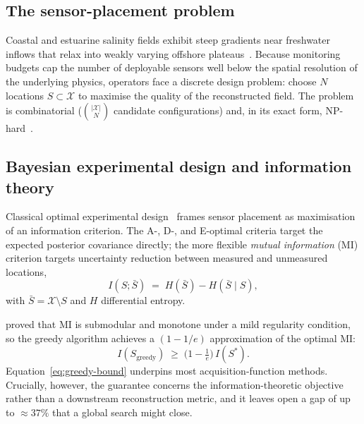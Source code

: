 \documentclass[11pt,letterpaper]{article}
\begin{document}
\subsection{The sensor-placement problem}
Coastal and estuarine salinity fields exhibit steep gradients near
freshwater inflows that relax into weakly varying offshore
plateaus~\citep{geyer2014estuarine}. Because monitoring budgets cap the
number of deployable sensors well below the spatial resolution of the
underlying physics, operators face a discrete design problem: choose
$N$ locations $S\subset\mathcal{X}$ to maximise the quality of the
reconstructed field. The problem is combinatorial
($\binom{|\mathcal{X}|}{N}$ candidate configurations) and, in its exact
form, NP-hard~\citep{ko1995exact}.

\subsection{Bayesian experimental design and information theory}
Classical optimal experimental
design~\citep{fedorov1972theory,chaloner1995bayesian} frames sensor
placement as maximisation of an information criterion. The A-, D-, and
E-optimal criteria target the expected posterior covariance directly;
the more flexible \emph{mutual information} (MI) criterion
\citep{caselton1984optimal,krause2008near} targets uncertainty
reduction between measured and unmeasured locations,
\begin{equation}
\label{eq:mi}
I(S;\bar S)\;=\;H(\bar S)-H(\bar S\mid S),
\end{equation}
with $\bar S=\mathcal{X}\setminus S$ and $H$ differential entropy.

\citet{krause2008near} proved that MI is submodular and monotone under
a mild regularity condition, so the greedy algorithm achieves a
$(1-1/e)$ approximation of the optimal MI:
\begin{equation}
\label{eq:greedy-bound}
I(S_{\text{greedy}})\;\ge\;\bigl(1-\tfrac{1}{e}\bigr)\,I(S^{*}).
\end{equation}
Equation~\eqref{eq:greedy-bound} underpins most acquisition-function
methods. Crucially, however, the guarantee concerns the
information-theoretic objective rather than a downstream reconstruction
metric, and it leaves open a gap of up to $\approx 37\%$ that a global
search might close.
\end{document}
